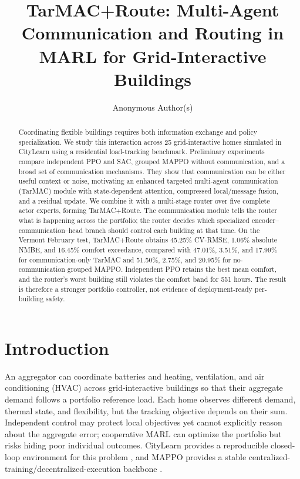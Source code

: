 \documentclass{article}
\title{TarMAC+Route: Multi-Agent Communication and Routing in MARL for
Grid-Interactive Buildings}
\author{Anonymous Author(s)}
\begin{document}
\maketitle

\begin{abstract}
Coordinating flexible buildings requires both information exchange and policy
specialization. We study this interaction across 25 grid-interactive homes
simulated in CityLearn using a residential load-tracking benchmark. Preliminary experiments
compare independent PPO and SAC, grouped MAPPO without communication, and a
broad set of communication mechanisms. They show that communication can be
either useful context or noise, motivating an enhanced targeted multi-agent
communication (TarMAC) module with state-dependent attention, compressed
local/message fusion, and a residual update. We combine it with a multi-stage
router over five complete actor experts, forming TarMAC+Route. The communication
module tells the router what is happening across the portfolio; the router
decides which specialized encoder--communication--head branch should control
each building at that time. On the Vermont February test, TarMAC+Route obtains
45.25\% CV-RMSE, 1.06\% absolute NMBE, and 16.45\% comfort exceedance, compared
with 47.01\%, 3.51\%, and 17.99\% for communication-only TarMAC and
51.50\%, 2.75\%, and 20.95\% for no-communication grouped MAPPO. Independent
PPO retains the best mean comfort, and the router's worst building still
violates the comfort band for 551 hours. The result is therefore a stronger
portfolio controller, not evidence of deployment-ready per-building safety.

\end{abstract}

\section{Introduction}


An aggregator can coordinate batteries and heating, ventilation, and air
conditioning (HVAC) across grid-interactive buildings so that their aggregate
demand follows a portfolio reference load.
Each home observes different demand, thermal state, and flexibility, but the
tracking objective depends on their sum. Independent control may protect local
objectives yet cannot explicitly reason about the aggregate error; cooperative
MARL can optimize the portfolio but risks hiding poor individual outcomes.
CityLearn provides a reproducible closed-loop environment for this problem
\citep{citylearn2020,citylearnv2}, and MAPPO provides a stable
centralized-training/decentralized-execution backbone \citep{mappo2022}.
\end{document}
